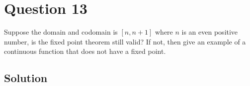 \section*{Question 13}

Suppose the domain and codomain is \( [n, n+1] \) where \( n \) is an even positive number, is the fixed point theorem still valid?
If not, then give an example of a continuous function that does not have a fixed point.

\subsection*{Solution}
